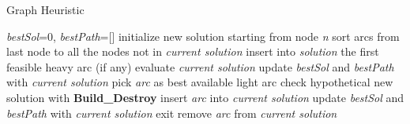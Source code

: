 \documentclass{article}
\begin{document}
\begin{algorithm}[H]
\caption{Graph Heuristic}\label{graph}
\begin{algorithmic}[1]
\State \textsl{bestSol}=0, \textsl{bestPath}=[]
    \State initialize new solution starting from node \textsl{n}
        \State sort arcs from last node to all the nodes not in \textsl{current solution}
        \State {\color{trolleygrey}{\#heavy arcs: profit + synergies - costUpper}}
        \State {\color{trolleygrey}{\#light arcs: profit + synergies - costNominal}}
            \State insert into \textsl{solution} the first feasible heavy arc (if any)
            \State evaluate \textsl{current solution}
                \State update \textsl{bestSol} and \textsl{bestPath} with \textsl{current solution}
            \EndIf
        \Else
                \State pick \textsl{arc} as best available light arc 
                \State check hypothetical new solution with \textbf{Build\_Destroy}
                    \State insert \textsl{arc} into \textsl{current solution}
                        \State update \textsl{bestSol} and \textsl{bestPath} with \textsl{current solution}
                    \EndIf
                    \State exit
                \Else
                    \State remove \textsl{arc} from \textsl{current solution}
                    \State {\color{trolleygrey}{\#try again with the next light arc}}
                \EndIf
            \EndFor
        \EndIf
    \EndWhile
\EndFor\\

\end{algorithmic}
\label{pseudo_code_graph}
\end{algorithm}
\end{document}
